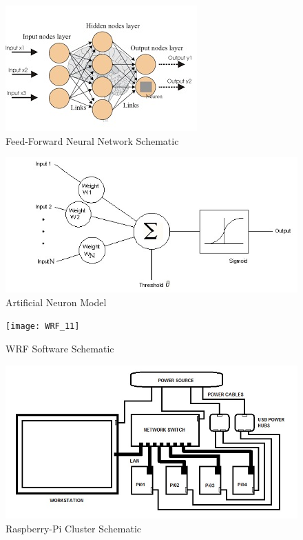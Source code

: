 \documentclass[12pt]{article}
\begin{document}
\begin{figure}[H]
\centering
\includegraphics[scale=0.5]{ANN11}
\caption{Feed-Forward Neural Network Schematic}
\label{figc6h3} %
\end{figure}

\begin{figure}[H]
\centering
\includegraphics[scale=0.5]{ANN22}
\caption{Artificial Neuron Model}
\label{figc6h4} %
\end{figure}

\begin{figure}[H]
\centering
\texttt{[image: WRF\_11]}
\caption{WRF Software Schematic}
\label{figc6h5} %
\end{figure}

\begin{figure}[H]
\centering
\includegraphics[scale=0.5]{RPiCluster_IMG1}
\caption{Raspberry-Pi Cluster Schematic}
\label{figc6h6} %
\end{figure}
\end{document}
